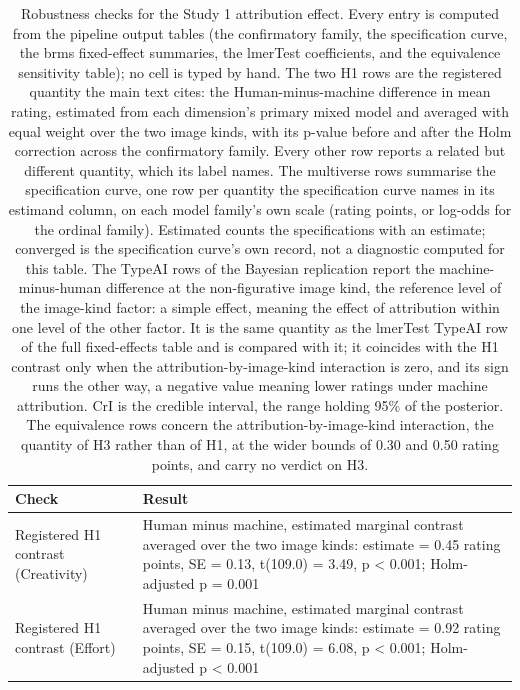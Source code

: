 \begin{table}[!h]
\centering
\caption{\label{tab:supp_table_1}Robustness checks for the Study 1 attribution effect. Every entry is computed from the pipeline output tables (the confirmatory family, the specification curve, the brms fixed-effect summaries, the lmerTest coefficients, and the equivalence sensitivity table); no cell is typed by hand. The two H1 rows are the registered quantity the main text cites: the Human-minus-machine difference in mean rating, estimated from each dimension's primary mixed model and averaged with equal weight over the two image kinds, with its p-value before and after the Holm correction across the confirmatory family. Every other row reports a related but different quantity, which its label names. The multiverse rows summarise the specification curve, one row per quantity the specification curve names in its estimand column, on each model family's own scale (rating points, or log-odds for the ordinal family). Estimated counts the specifications with an estimate; converged is the specification curve's own record, not a diagnostic computed for this table. The TypeAI rows of the Bayesian replication report the machine-minus-human difference at the non-figurative image kind, the reference level of the image-kind factor: a simple effect, meaning the effect of attribution within one level of the other factor. It is the same quantity as the lmerTest TypeAI row of the full fixed-effects table and is compared with it; it coincides with the H1 contrast only when the attribution-by-image-kind interaction is zero, and its sign runs the other way, a negative value meaning lower ratings under machine attribution. CrI is the credible interval, the range holding 95\% of the posterior. The equivalence rows concern the attribution-by-image-kind interaction, the quantity of H3 rather than of H1, at the wider bounds of 0.30 and 0.50 rating points, and carry no verdict on H3.}
\centering
\fontsize{9}{11}\selectfont
\begin{tabular}[t]{l>{\raggedright\arraybackslash}p{10cm}}
\toprule
Check & Result\\
\midrule
Registered H1 contrast (Creativity) & Human minus machine, estimated marginal contrast averaged over the two image kinds: estimate = 0.45 rating points, SE = 0.13, t(109.0) = 3.49, p < 0.001; Holm-adjusted p = 0.001\\
Registered H1 contrast (Effort) & Human minus machine, estimated marginal contrast averaged over the two image kinds: estimate = 0.92 rating points, SE = 0.15, t(109.0) = 6.08, p < 0.001; Holm-adjusted p < 0.001\\

\end{tabular}
\end{table}
